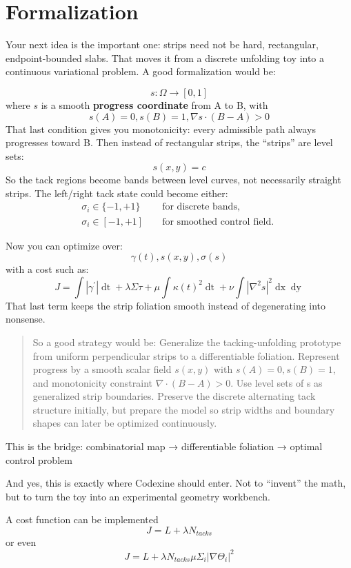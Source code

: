 \section{Formalization}

Your next idea is the important one:
strips need not be hard, rectangular, endpoint-bounded slabs.
That moves it from a discrete unfolding toy into a continuous variational problem.
A good formalization would be:

\[s:\Omega \rightarrow [0,1]\]
where \(s\) is a smooth \textbf{progress coordinate} from A to B, with
\[s(A)=0,s(B)=1,\nabla s \cdot (B-A)>0\]
That last condition gives you monotonicity: every admissible path always progresses toward B.
Then instead of rectangular strips, the “strips” are level sets:
\[s(x,y)=c\]
So the tack regions become bands between level curves, not necessarily straight strips.
The left/right tack state could become either:
\begin{align}
  \sigma_i \in \{ -1, +1\}  && \text{ for discrete bands, } \\
   \sigma_i \in [ -1, +1]  && \text{ for  smoothed control field. } 
\end{align}

Now you can optimize over:
\[ \gamma(t),s(x,y),\sigma(s) \]
with a cost such as:
\[ J=\int | \gamma^\prime|  \mathop{dt}  + \lambda \Sigma \tau + \mu \int \kappa(t)^2\mathop{dt} + \nu \int |\nabla^2 s|^2 \mathop{dx}\mathop{dy} \]
That last term keeps the strip foliation smooth instead of degenerating into nonsense.

\begin{quote}
So a good strategy would be: Generalize the tacking-unfolding prototype from uniform perpendicular strips to a differentiable foliation. Represent progress by a smooth scalar field \(s(x,y)\) with \(s(A)=0, s(B)=1\), and monotonicity constraint \( \nabla \cdot (B-A)>0\). Use level sets of s as generalized strip boundaries. Preserve the discrete alternating tack structure initially, but prepare the model so strip widths and boundary shapes can later be optimized continuously.
\end{quote}

This is the bridge:
combinatorial map → differentiable foliation → optimal control problem

And yes, this is exactly where Codexine should enter. Not to “invent” the math, but to turn the toy into an experimental geometry workbench.

A cost function can be implemented
\[ J = L + \lambda N_{tacks} \]
or even
\[ J=  L + \lambda N_{tacks} \mu \Sigma_i |\nabla \Theta_i|^2 \]

